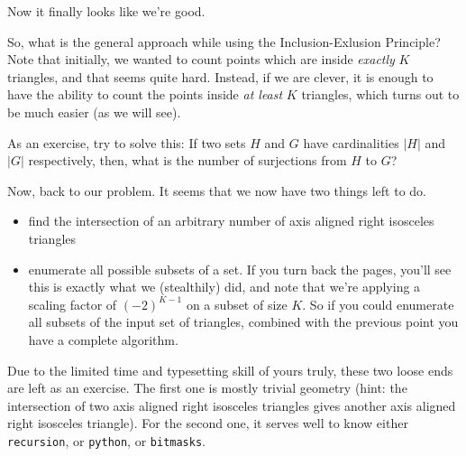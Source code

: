         Now it finally looks like we're good.

        So, what is the general approach while using the Inclusion-Exlusion Principle?
        Note that initially, we wanted to count points which are inside \emph{exactly} $K$ triangles,
        and that seems quite hard. Instead, if we are clever, it is enough to have the ability to
        count the points inside \emph{at least} $K$ triangles, which turns out to be much easier
        (as we will see).
        
        As an exercise, try to solve this:
        If two sets $H$ and $G$ have cardinalities $|H|$ and $|G|$ respectively, then, what is the
        number of surjections from $H$ to $G$?

        Now, back to our problem. It seems that we now have two things left to do.
        \begin{itemize}
            \item find the intersection of an arbitrary number of axis aligned right isosceles triangles
            \item enumerate all possible subsets of a set. If you turn back the pages, you'll see this is
            exactly what we (stealthily) did, and note that we're applying a scaling factor of $(-2)^{K - 1}$
            on a subset of size $K$. So if you could enumerate all subsets of the input set of triangles,
            combined with the previous point you have a complete algorithm.
        \end{itemize}

        Due to the limited time and typesetting skill of yours truly, these two loose ends are left as
        an exercise.
        The first one is mostly trivial geometry (hint: the intersection of two axis aligned right isosceles triangles
        gives another axis aligned right isosceles triangle).
        For the second one, it serves well to know either \verb|recursion|, or \verb|python|, or \verb|bitmasks|.
